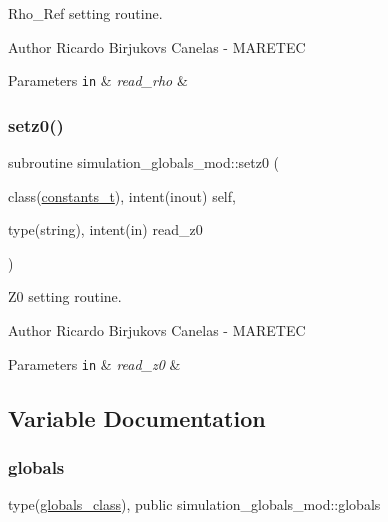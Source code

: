 Rho\+\_\+\+Ref setting routine. 

\begin{DoxyAuthor}{Author}
Ricardo Birjukovs Canelas -\/ M\+A\+R\+E\+T\+EC 
\end{DoxyAuthor}

\begin{DoxyParams}[1]{Parameters}
\mbox{\tt in}  & {\em read\+\_\+rho} & \\
\hline
\end{DoxyParams}
\mbox{\label{namespacesimulation__globals__mod_a64b1d91147c1cd5898fec8f23d56a65d}} 
\subsubsection{\texorpdfstring{setz0()}{setz0()}}
{\footnotesize\ttfamily subroutine simulation\+\_\+globals\+\_\+mod\+::setz0 (\begin{DoxyParamCaption}\item[{class(\hyperlink{structsimulation__globals__mod_1_1constants__t}{constants\+\_\+t}), intent(inout)}]{self,  }\item[{type(string), intent(in)}]{read\+\_\+z0 }\end{DoxyParamCaption})\hspace{0.3cm}{\ttfamily [private]}}



Z0 setting routine. 

\begin{DoxyAuthor}{Author}
Ricardo Birjukovs Canelas -\/ M\+A\+R\+E\+T\+EC 
\end{DoxyAuthor}

\begin{DoxyParams}[1]{Parameters}
\mbox{\tt in}  & {\em read\+\_\+z0} & \\
\hline
\end{DoxyParams}


\subsection{Variable Documentation}
\mbox{\label{namespacesimulation__globals__mod_a04123075b6de525703edb89697fc39e9}} 
\subsubsection{\texorpdfstring{globals}{globals}}
{\footnotesize\ttfamily type(\hyperlink{structsimulation__globals__mod_1_1globals__class}{globals\+\_\+class}), public simulation\+\_\+globals\+\_\+mod\+::globals}

